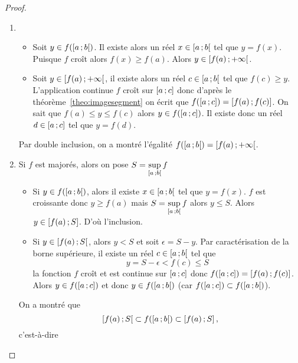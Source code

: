 \begin{proof}
  \begin{enumerate}
  \item
    \begin{itemize}
    \item Soit $y \in f(\left[ a \, ;  b \right[)$. Il existe alors un réel $x \in \left[ a \, ;  b \right[$ tel que $y=f(x)$. Puisque $f$ croît alors $f(x) \geq f(a)$. Alors $y \in \left[ f(a) \, ;  +\infty \right[$.
    \item Soit $y \in \left[ f(a) \, ;  +\infty \right[$, il existe alors un réel $c \in \left[ a \, ;  b \right[$ tel que $f(c) \geq y$. L'application continue $f$ croît sur $\left[ a \, ;  c \right]$ donc d'après le théorème~\ref{theo:imagesegment} on écrit que $f(\left[ a \, ;  c \right])=\left[ f(a) \, ;  f(c) \right]$. On sait que $f(a) \le y \leq f(c)$ alors $y \in f(\left[ a \, ;  c \right])$. Il existe donc un réel $d \in \left[ a \, ;  c \right]$ tel que $y=f(d)$.
    \end{itemize}
    Par double inclusion, on a montré l'égalité $f(\left[ a \, ;  b \right[)=\left[ f(a) \, ;  +\infty \right[$.
  \item Si $f$ est majorés, alors on pose $S=\sup\limits_{\left[ a \, ;  b \right[}f$
    \begin{itemize}
    \item Si $y \in f(\left[ a \, ;  b \right[)$, alors il existe $x \in \left[ a \, ;  b \right[$ tel que $y=f(x)$. $f$ est croissante donc $y \geq f(a)$ mais $S=\sup\limits_{\left[ a \, ;  b \right[}f$ alors $y \leq S$. Alors $y \in \left[ f(a) \, ;  S \right]$. D'où l'inclusion.
    \item Si $y \in \left[ f(a) \, ;  S \right[$, alors $y < S$ et soit $\epsilon=S-y$. Par caractérisation de la borne supérieure, il existe un réel $c \in \left[ a \, ;  b \right[$ tel que
      \begin{equation}
        y=S-\epsilon < f(c) \leq S
      \end{equation}
      la fonction $f$ croît et est continue sur $\left[ a \, ;  c \right]$ donc $f(\left[ a \, ;  c \right])=\left[ f(a) \, ;  f(c) \right]$. Alors $y \in f(\left[ a \, ;  c \right])$ et donc $y \in f(\left[ a \, ;  b \right[)$ (car $f(\left[ a \, ;  c \right]) \subset f(\left[ a \, ;  b \right[)$).
    \end{itemize}
    On a montré que
    \begin{equation}
      \left[ f(a) \, ;  S \right[ \subset f(\left[ a \, ;  b \right[) \subset \left[ f(a) \, ;  S \right],
    \end{equation}
    c'est-à-dire
    \begin{equation}

\end{equation}
\end{enumerate}
\end{proof}
